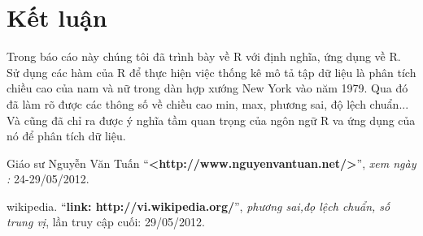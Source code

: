 \documentclass[a4paper]{article}
\begin{document}
\section{Kết luận}
	Trong báo cáo này chúng tôi đã trình bày về R với định nghĩa, ứng dụng về R. Sử dụng các hàm của R để thực hiện việc thống kê mô tả tập dữ liệu là phân tích chiều cao của nam và nữ trong dàn hợp xướng New York vào năm 1979.
Qua đó đã làm rõ được các thông số về chiều cao min, max, phương sai, độ lệch chuẩn... Và cũng đã chỉ ra được ý nghĩa tầm quan trọng của ngôn ngữ R va ứng dụng của nó để phân tích dữ liệu.


\begin{thebibliography}{80}


Giáo sư Nguyễn Văn Tuấn
``\textbf{<http://www.nguyenvantuan.net/>}'', 
\textit{xem ngày :} 24-29/05/2012.


wikipedia.
``\textbf{link: http://vi.wikipedia.org/}'',
\textit{phương sai,đọ lệch chuẩn, số trung vị}, lần truy cập cuối: 29/05/2012.


\end{thebibliography}
\end{document}
